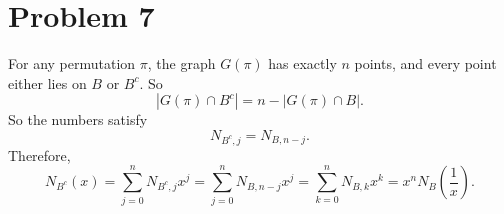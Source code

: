 \documentclass{article}
\begin{document}
\section*{Problem 7}
For any permutation $\pi$, the graph $G(\pi)$ has exactly $n$ points, and every point either lies on $B$ or $B^c$. So
$$|G(\pi) \cap B^c| = n - |G(\pi) \cap B|.$$
So the numbers satisfy
$$N_{B^c, j} = N_{B, n - j}.$$
Therefore,
$$N_{B^c}(x) = \sum_{j = 0}^n N_{B^c, j}x^j = \sum_{j = 0}^nN_{B, n - j}x^j = \sum_{k = 0}^nN_{B, k}x^k = x^nN_{B}\left(\frac{1}{x}\right).$$
\end{document}
